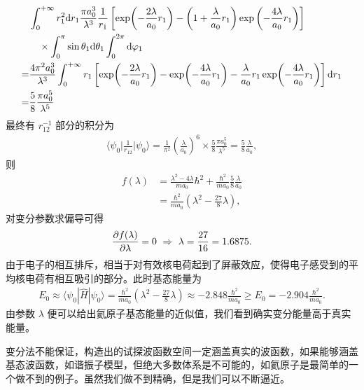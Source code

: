\begin{align}
    &\int_0^{+\infty} r_1^2 \mathrm{d} r_1 \frac{\pi a_0^3}{\lambda^3} \frac1{r_1}  
    \left[
        \exp\!\left(-\frac{2\lambda}{a_0}r_1\right) - \left(1+\frac{\lambda}{a_0}r_1\right) \exp\left(-\frac{4\lambda}{a_0}r_1\right)
    \right] \notag \\
    &\quad \times \int_0^\pi \sin\theta_1 \mathrm{d}\theta_1
    \int_0^{2\pi} \mathrm{d}\varphi_1 \\
    =& \frac{4\pi^2 a_0^3}{\lambda^3} \int_0^{+\infty} r_1 
    \left[
        \exp\!\left(-\frac{2\lambda}{a_0} r_1\right) - \exp\!\left(-\frac{4\lambda}{a_0}r_1\right) - 
        \frac{\lambda}{a_0} r_1 \exp\!\left(-\frac{4\lambda}{a_0} r_1\right)
    \right] \mathrm{d} r_1 \notag
    \\
    =& \frac58 \frac{\pi a_0^5}{\lambda^5}
\end{align}
最终有 $r_{12}^{-1}$ 部分的积分为
\begin{align}
    \bigg\langle \psi_0 \bigg| \frac1{r_{12}} \bigg| \psi_0 \bigg\rangle = \frac1{\pi^2}\left(\frac{\lambda}{a_0}\right)^6 \times \frac58 \frac{\pi a_0^5}{\lambda^5} = \frac58 \frac{\lambda}{a_0},
\end{align}
则
\begin{align}
    f(\lambda) &= \frac{\lambda^2 - 4\lambda}{ma_0}\hbar^2 + \frac{\hbar^2}{ma_0} \frac58 \frac{\lambda}{a_0} \\
    &= \frac{\hbar^2}{ma_0} \left(\lambda^2 - \frac{27}8 \lambda\right), 
\end{align}
对变分参数求偏导可得
\begin{align}
    \pdv{f(\lambda)}{\lambda} = 0 \ \Rightarrow \ \lambda = \frac{27}{16} = \num{1.6875}.
\end{align}
由于电子的相互排斥，相当于对有效核电荷起到了屏蔽效应，使得电子感受到的平均核电荷有相互吸引的部分。此时基态能量为
\begin{align}
    E_0 \approx \langle \psi_0|\hat H | \psi_0\rangle = \frac{\hbar^2}{ma_0} \left(\lambda^2 - \frac{27}8 \lambda\right) \approx \num{-2.848} \frac{\hbar^2}{ma_0} \geqslant E_0 = \num{-2.904} \frac{\hbar^2}{ma_0}. 
\end{align}
由参数 $\lambda$ 便可以给出氦原子基态能量的近似值，我们看到确实变分能量高于真实能量。

变分法不能保证，构造出的试探波函数空间一定涵盖真实的波函数，如果能够涵盖基态波函数，如谐振子模型，但绝大多数体系是不可能的，如氦原子是最简单的一个做不到的例子。虽然我们做不到精确，但是我们可以不断逼近。


